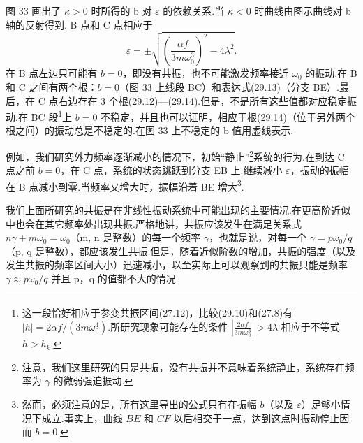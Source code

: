 图 33 画出了 $\kappa>0$ 时所得的 b 对 $\varepsilon$ 的依赖关系.当 $\kappa<0$ 时曲线由图示曲线对 b 轴的反射得到. B 点和 C 点相应于
\begin{equation*}
  \varepsilon=\pm\sqrt{\left(\frac{\alpha f}{3m\omega_0^3}\right)^2-4\lambda^2}.
\end{equation*}
在 B 点左边只可能有 $b=0$，即没有共振，也不可能激发频率接近 $\omega_0$ 的振动.在 B 和 C 之间有两个根：$b=0$（图 33 上线段 BC）和表达式(29.13)（分支 BE）.最后，在 C 点右边存在 3 个根(29.12)—(29.14).但是，不是所有这些值都对应稳定振动.在 BC 段\footnote{这一段恰好相应于参变共振区间(27.12)，比较(29.10)和(27.8)有 $|h|=2\alpha f/(3m\omega_0^4)$.所研究现象可能存在的条件 $\left|\frac{2\alpha f}{3m\omega_0^3}\right|>4\lambda$ 相应于不等式 $h>h_k$.}上 $b=0$ 不稳定，并且也可以证明，相应于根(29.14)（位于另外两个根之间）的振动总是不稳定的.在图 33 上不稳定的 b 值用虚线表示.

例如，我们研究外力频率逐渐减小的情况下，初始“静止”\footnote{注意，我们这里研究的只是共振，没有共振并不意味着系统静止，系统存在频率为 $\gamma$ 的微弱强迫振动.}系统的行为.在到达 C 点之前 $b=0$，在 C 点，系统的状态跳跃到分支 EB 上.继续减小 $\varepsilon$，振动的振幅在 B 点减小到零.当频率又增大时，振幅沿着 BE 增大\footnote{然而，必须注意的是，所有这里导出的公式只有在振幅 $b$（以及 $\varepsilon$）足够小情况下成立.事实上，曲线 $BE$ 和 $CF$ 以后相交于一点，达到这点时振动停止因而 $b=0$.}.

我们上面所研究的共振是在非线性振动系统中可能出现的主要情况.在更高阶近似中也会在其它频率处出现共振.严格地讲，共振应该发生在满足关系式
$n\gamma+m\omega_0=\omega_0$（m, n 是整数）的每一个频率 $\gamma$，也就是说，对每一个 $\gamma=p\omega_0/q$（p, q 是整数），都应该发生共振.但是，随着近似阶数的增加，共振的强度（以及发生共振的频率区间大小）迅速减小，以至实际上可以观察到的共振只能是频率 $\gamma\approx p\omega_0/q$ 并且 p，q 的值都不大的情况.

